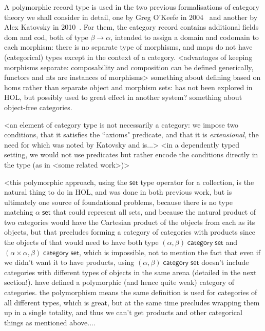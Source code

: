 \documentclass[twoside,titlepage,11pt]{article}
\begin{document}
A polymorphic record type is used in the two previous formalisations of category theory we shall consider in detail, one by Greg O'Keefe in 2004~\cite{DBLP:journals/entcs/OKeefe04} and another by Alex Katovsky in 2010~\cite{Katovsky}.
For them, the category record contains additional fields $\mathrm{dom}$ and $\mathrm{cod}$, both of type $\beta\to\alpha$, intended to assign a domain and codomain to each morphism: there is no separate type of morphisms, and maps do not have (categorical) types except in the context of a category.
<advantages of keeping morphisms separate: composability and composition can be defined generically, functors and nts are instances of morphisms>
something about defining based on homs rather than separate object and morphism sets: has not been explored in HOL, but possibly used to great effect in another system?
something about object-free categories.

<an element of category type is not necessarily a category: we impose two conditions, that it satisfies the ``axioms" predicate, and that it is \emph{extensional}, the need for which was noted by Katovsky and is...>
<in a dependently typed setting, we would not use predicates but rather encode the conditions directly in the type (as in <some related work>)>

<this polymorphic approach, using the $\mathsf{set}$ type operator for a collection, is the natural thing to do in HOL, and was done in both previous work, but is ultimately one source of foundational problems, because there is no type matching $\alpha\;\mathsf{set}$ that could represent all sets, and because the natural product of two categories would have the Cartesian product of the objects from each as its objects, but that precludes forming a category of categories with products since the objects of that would need to have both type $(\alpha,\beta)\;\mathsf{category}\;\mathsf{set}$ and $(\alpha\times\alpha,\beta)\;\mathsf{category}\;\mathsf{set}$, which is impossible, not to mention the fact that even if we didn't want it to have products, using $(\alpha,\beta)\;\mathsf{category}\;\mathsf{set}$ doesn't include categories with different types of objects in the same arena (detailed in the next section!). 
have defined a polymorphic (and hence quite weak) category of categories. the polymorphism means the same definition is used for categories of all different types, which is great, but at the same time precludes wrapping them up in a single totality, and thus we can't get products and other categorical things as mentioned above....
\end{document}
